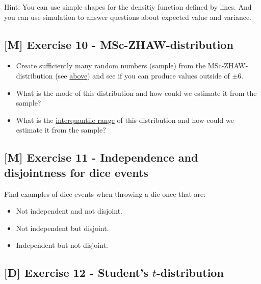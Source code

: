 \documentclass[
]{book}
\providecommand{\tightlist}{%
  \setlength{\itemsep}{0pt}\setlength{\parskip}{0pt}}
\begin{document}
Hint: You can use simple shapes for the densitiy function defined by lines. And you can use simulation to answer questions about expected value and variance.

\subsection{{[}M{]} Exercise 10 - MSc-ZHAW-distribution}\label{exercise10}

\begin{itemize}
\tightlist
\item
  Create sufficiently many random numbers (sample) from the MSc-ZHAW-distribution (see \hyperref[discrete_probability_distributions]{above})
  and see if you can produce values outside of \(\pm 6\).
\item
  What is the mode of this distribution and how could we estimate it from the sample?
\item
  What is the \href{https://en.wikipedia.org/wiki/Interquartile_range}{interquantile range} of this distribution and how could we estimate it from the sample?
\end{itemize}

\subsection{{[}M{]} Exercise 11 - Independence and disjointness for dice events}\label{exercise11}

Find examples of dice events when throwing a die once that are:

\begin{itemize}
\tightlist
\item
  Not independent and not disjoint.
\item
  Not independent but disjoint.
\item
  Independent but not disjoint.
\end{itemize}

\subsection{\texorpdfstring{{[}D{]} Exercise 12 - Student's \(t\)-distribution}{{[}D{]} Exercise 12 - Student's t-distribution}}\label{exercise12}
\end{document}
